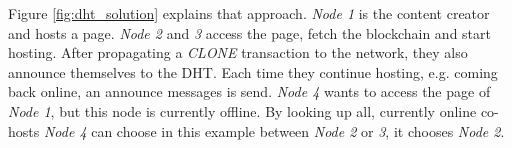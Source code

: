 Figure \ref{fig:dht_solution} explains that approach. \textit{Node 1} is the
content creator and hosts a page. \textit{Node 2} and \textit{3} access the
page, fetch the blockchain and start hosting. After propagating a
\textit{CLONE} transaction to the network, they also announce themselves to
the DHT. Each time they continue hosting, e.g. coming back online,
an announce messages is send. \textit{Node 4} wants to access the page of
\textit{Node 1}, but this node is currently offline. By looking up all,
currently online co-hosts \textit{Node 4} can choose in this example between
\textit{Node 2} or \textit{3}, it chooses \textit{Node 2}.
